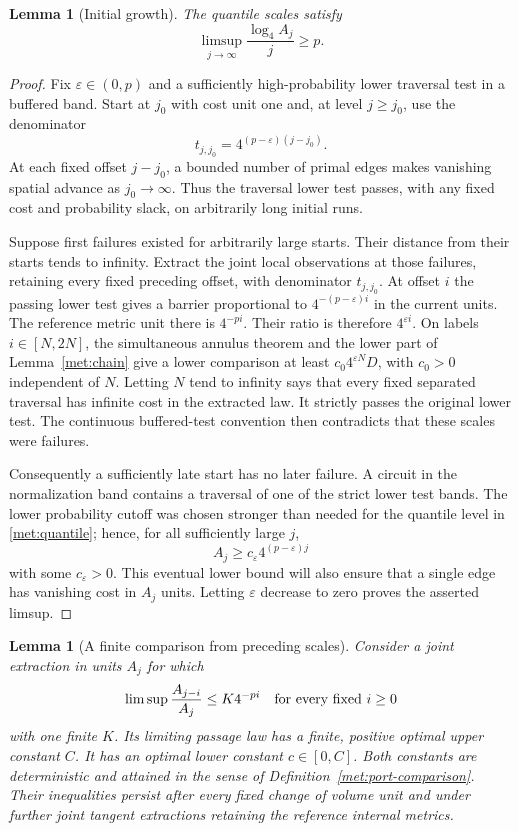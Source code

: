 \documentclass[11pt]{article}
\numberwithin{equation}{section}
\newtheorem{lemma}[theorem]{Lemma}
\theoremstyle{definition}
\theoremstyle{remark}
\newcommand{\1}{\mathbf 1}
\begin{document}
\begin{lemma}[Initial growth]
\label{met:initial-growth}
The quantile scales satisfy
\[
 \limsup_{j\to\infty}\frac{\log_4 A_j}{j}\geq p.
\]
\end{lemma}

\begin{proof}
Fix $\varepsilon\in(0,p)$ and a sufficiently high-probability lower
traversal test in a buffered band.  Start at $j_0$ with cost unit one
and, at level $j\geq j_0$, use the denominator
\[
 t_{j,j_0}=4^{(p-\varepsilon)(j-j_0)}.
\]
At each fixed offset $j-j_0$, a bounded number of primal edges makes
vanishing spatial advance as $j_0\to\infty$.  Thus the traversal
lower test passes, with any fixed cost and probability slack, on
arbitrarily long initial runs.

Suppose first failures existed for arbitrarily large starts.  Their
distance from their starts tends to infinity.  Extract the joint local
observations at those failures, retaining every fixed preceding
offset, with denominator $t_{j,j_0}$.  At offset $i$ the passing lower
test gives a barrier proportional to
$4^{-(p-\varepsilon)i}$ in the current units.  The reference metric
unit there is $4^{-pi}$.  Their ratio is therefore $4^{\varepsilon i}$.
On labels $i\in[N,2N]$, the simultaneous annulus theorem and the lower
part of Lemma~\ref{met:chain} give a lower comparison at least
$c_0 4^{\varepsilon N}D$, with $c_0>0$ independent of $N$.
Letting $N$ tend to infinity says that every fixed separated traversal
has infinite cost in the extracted law.  It strictly passes the
original lower test.  The continuous buffered-test convention then
contradicts that these scales were failures.

Consequently a sufficiently late start has no later failure.  A
circuit in the normalization band contains a traversal of one of the
strict lower test bands.  The lower probability cutoff was chosen
stronger than needed for the quantile level in
\eqref{met:quantile}; hence, for all sufficiently large $j$,
\[
 A_j\geq c_\varepsilon 4^{(p-\varepsilon)j}
\]
with some $c_\varepsilon>0$.  This eventual lower bound will also ensure that a single edge has
vanishing cost in $A_j$ units.  Letting $\varepsilon$ decrease to zero
proves the asserted limsup.
\end{proof}

\begin{lemma}[A finite comparison from preceding scales]
\label{met:finite-upper}
Consider a joint extraction in units $A_j$ for which
\begin{equation}
 \limsup \frac{A_{j-i}}{A_j}\leq K4^{-pi}
 \quad\hbox{for every fixed }i\geq0
 \label{met:preceding-upper}
\end{equation}
with one finite $K$.  Its limiting passage law has a finite, positive
optimal upper constant $C$.  It has an optimal lower constant
$c\in[0,C]$.  Both constants are deterministic and attained in the
sense of Definition~\ref{met:port-comparison}.  Their inequalities
persist after every fixed change of volume unit and under further
joint tangent extractions retaining the reference internal metrics.
\end{lemma}
\end{document}
